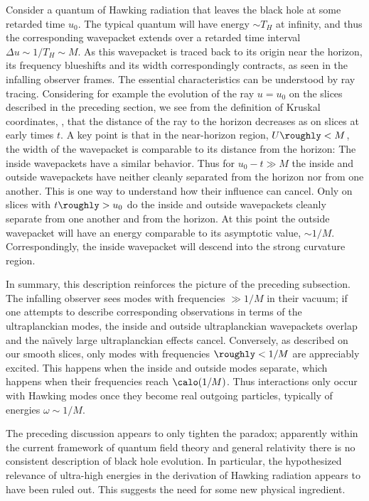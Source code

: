 Consider a quantum of Hawking radiation that leaves the black hole at some retarded time $u_0$.  The typical quantum will have 
energy $\sim T_H$ at infinity, and thus the corresponding wavepacket extends over a retarded time interval $\Delta u\sim 1/T_H\sim M$.  As this wavepacket is traced back to its origin near the horizon, its frequency blueshifts and its width correspondingly contracts, as seen in the infalling observer frames.  The essential characteristics can be understood by ray tracing.  Considering for example the evolution of the ray $u=u_0$ on the slices described in the preceding section, we see from the definition of Kruskal coordinates, \kruskdef, that the distance of the ray to the horizon decreases as 
%
\eqn{}
%
on slices at early times $t$.  A key point is that in the near-horizon region, $U\roughly<M$, the width of the wavepacket is comparable to its distance from the horizon:
%
\eqn{}
%
The inside wavepackets have a similar behavior.  Thus for $u_0-t\gg M$ the inside and outside wavepackets have neither cleanly separated from the horizon nor from one another.  This is one way to understand how their influence can cancel.  Only on slices with $t\roughly>u_0$ do the inside and outside wavepackets cleanly separate from one another and from the horizon. At this point the outside wavepacket will have an energy comparable to its asymptotic value, $\sim 1/M$.  Correspondingly, the inside wavepacket will descend into the strong curvature region.

In summary, this description reinforces the picture of the preceding subsection.  The infalling observer sees modes with frequencies $\gg 1/M$ in their vacuum; if one attempts to describe corresponding observations in terms of the ultraplanckian modes, the inside and outside ultraplanckian wavepackets overlap and the na\"\i vely large ultraplanckian effects cancel.  Conversely, as described on our smooth slices, only modes with frequencies $\roughly<1/M$ are appreciably excited.  This happens when the inside and outside modes separate, which happens when their frequencies reach $\calo(1/M)$.  Thus interactions only occur with Hawking modes once they become real outgoing particles, typically of energies $\omega\sim 1/M$.


The preceding discussion appears to only tighten the paradox; apparently within the current framework of quantum field theory and general relativity there is no consistent description of black hole evolution.  In particular, the hypothesized relevance of ultra-high energies in the derivation of Hawking radiation appears to have been   ruled out.  This suggests the need for some new physical ingredient.


